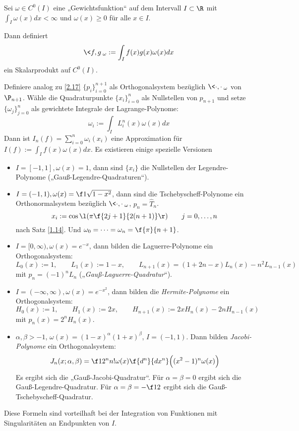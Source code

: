 \documentclass[11pt]{scrbook}
\begin{document}
\begin{nt*}
	Sei $\omega \in C^0(I)$ eine „Gewichtsfunktion“ auf dem Intervall $I\subset \R$ mit $\int_I \omega(x) dx < \infty$ und $\omega(x) \ge 0$ für alle $x\in I$.

	Dann definiert 
	\[
		\<f,g\>_\omega := \int_I f(x) g(x) \omega(x) dx
	\]
	ein Skalarprodukt auf $C^0(I)$.

	Definiere analog zu \ref{2.17} $\{p_i\}_{i=0}^{n+1}$ als Orthogonalsystem bezüglich $\<\cdot,\cdot\>_\omega$ von $\P_{n+1}$.
	Wähle die Quadraturpunkte $\{x_i\}_{i=0}^n$ als Nullstellen von $p_{n+1}$ und setze $\{\omega_j\}_{j=0}^n$ als gewichtete Integrale der Lagrange-Polynome:
	\[
		\omega_i := \int_I L_i^n(x) \omega(x) dx
	\]
	Dann ist $I_n(f) = \sum_{i=0}^n\omega_i (x_i)$ eine Approximation für $I(f) := \int_I f(x) \omega(x) dx$.
	Es existieren einige spezielle Versionen
	\begin{itemize}
		\item
			$I=[-1,1], \omega(x) =1$, dann sind $\{x_i\}$ die Nullstellen der Legendre-Polynome („Gauß-Legendre-Quadraturen“).
		\item
			$I=(-1,1), \omega(x) = \f 1{\sqrt{1-x^2}}$, dann sind die Tschebyscheff-Polynome ein Orthonormalsystem bezüglich $\<\cdot,\cdot\>_\omega$, $p_n= \hat T_n$.
			\[
				x_i := \cos \l(\pi \f {2j+1}{2(n+1)}\r) \qquad j= 0,\dotsc, n
			\]
			nach Satz \ref{1.14}. Und $\omega_0 = \dotsb = \omega_n = \f {\pi}{n+1}$.
		\item
			$I=[0,\infty), \omega(x) = e^{-x}$, dann bilden die Laguerre-Polynome ein Orthogonalsystem:
			\[
				L_0(x) := 1, \qquad L_1(x) := 1-x, \qquad L_{n+1}(x) = (1+2n-x)L_n(x) - n^2 L_{n-1}(x)
			\]
			mit $p_n = (-1)^n L_n$ („\emph{Gauß-Laguerre-Quadratur}“).
		\item
			$I=(-\infty,\infty), \omega(x) = e^{-x^2}$, dann bilden die \emph{Hermite-Polynome} ein Orthogonalsystem:
			\[
				H_0(x) := 1, \qquad H_1(x) := 2x, \qquad H_{n+1}(x) := 2xH_n(x) - 2nH_{n-1}(x)
			\]
			mit $p_n(x)=2^n H_n(x)$.
		\item
			$\alpha, \beta > -1$, $\omega(x) = (1-x)^\alpha (1+x)^\beta$, $I=(-1,1)$.
			Dann bilden \emph{Jacobi-Polynome} ein Orthogonalsystem:
			\[
				J_n(x;\alpha,\beta) = \f 1{2^n n! \omega(x)}\f {d^n}{dx^n}\Big( (x^2-1)^n \omega(x)\Big)
			\]
			Es ergibt sich die „Gauß-Jacobi-Quadratur“.
			Für $\alpha=\beta=0$ ergibt sich die Gauß-Legendre-Quadratur.
			Für $\alpha=\beta= -\f 12$ ergibt sich die Gauß-Tschebyscheff-Quadratur.
	\end{itemize}
	Diese Formeln sind vorteilhaft bei der Integration von Funktionen mit Singularitäten an Endpunkten von $I$.
\end{nt*}
\end{document}
